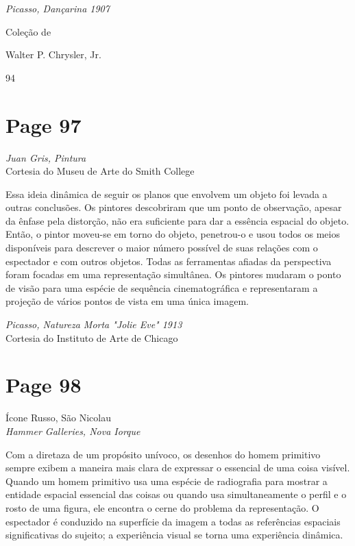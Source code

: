 \documentclass[a4paper]{article}
\begin{document}
\par %

{\raggedright\itshape
Picasso, Dançarina 1907 \par
Coleção de \par
Walter P. Chrysler, Jr. \par
}

\par %

94

\newpage
\section*{Page 97}

\textit{Juan Gris, Pintura}\\
Cortesia do Museu de Arte do Smith College

Essa ideia dinâmica de seguir os planos que envolvem um objeto foi levada a outras conclusões. Os pintores descobriram que um ponto de observação, apesar da ênfase pela distorção, não era suficiente para dar a essência espacial do objeto. Então, o pintor moveu-se em torno do objeto, penetrou-o e usou todos os meios disponíveis para descrever o maior número possível de suas relações com o espectador e com outros objetos. Todas as ferramentas afiadas da perspectiva foram focadas em uma representação simultânea. Os pintores mudaram o ponto de visão para uma espécie de sequência cinematográfica e representaram a projeção de vários pontos de vista em uma única imagem.

\textit{Picasso, Natureza Morta "Jolie Eve" 1913}\\
Cortesia do Instituto de Arte de Chicago

\vspace*{\fill}

\newpage
\section*{Page 98}

\raggedright
Ícone Russo, São Nicolau\\
\textit{Hammer Galleries, Nova Iorque}

\vspace{2em}

Com a diretaza de um propósito unívoco, os desenhos do homem primitivo sempre exibem a maneira mais clara de expressar o essencial de uma coisa visível. Quando um homem primitivo usa uma espécie de radiografia para mostrar a entidade espacial essencial das coisas ou quando usa simultaneamente o perfil e o rosto de uma figura, ele encontra o cerne do problema da representação. O espectador é conduzido na superfície da imagem a todas as referências espaciais significativas do sujeito; a experiência visual se torna uma experiência dinâmica.
\end{document}
